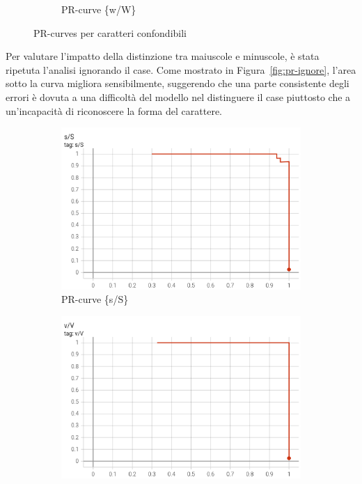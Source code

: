 \begin{figure}[htbp]
\begin{subfigure}[t]{0.32\textwidth}
        \caption{PR-curve \{w/W\}}
    \end{subfigure}
    \caption{PR-curves per caratteri confondibili}
    \label{fig:pr-confondibili}
\end{figure}

Per valutare l'impatto della distinzione tra maiuscole e minuscole, è stata ripetuta l'analisi ignorando il case. Come mostrato in Figura~\ref{fig:pr-ignore}, l'area sotto la curva migliora sensibilmente, suggerendo che una parte consistente degli errori è dovuta a una difficoltà del modello nel distinguere il case piuttosto che a un'incapacità di riconoscere la forma del carattere.
\begin{figure}[htbp]
    \centering
    \begin{subfigure}[t]{0.32\textwidth}
        \centering
        \includegraphics[width=\textwidth]{images/pr_ignore1.png}
        \caption{PR-curve \{s/S\}}
    \end{subfigure}
    \begin{subfigure}[t]{0.32\textwidth}
        \centering
        \includegraphics[width=\textwidth]{images/pr_ignore2.png}

\end{subfigure}
\end{figure}

